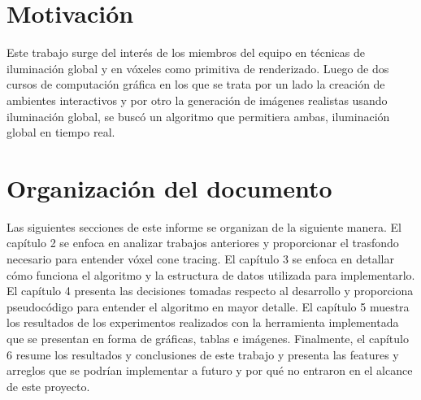 \section{Motivación}


Este trabajo surge del interés de los miembros del equipo en técnicas de iluminación global y en vóxeles como primitiva de renderizado.
Luego de dos cursos de computación gráfica en los que se trata por un lado la creación de ambientes interactivos y por otro la generación de imágenes realistas usando iluminación global, se buscó un algoritmo que permitiera ambas, iluminación global en tiempo real.

\section{Organización del documento}

Las siguientes secciones de este informe se organizan de la siguiente manera.
El capítulo 2 se enfoca en analizar trabajos anteriores y proporcionar el trasfondo necesario para entender vóxel cone tracing.
El capítulo 3 se enfoca en detallar cómo funciona el algoritmo y la estructura de datos utilizada para implementarlo.
El capítulo 4 presenta las decisiones tomadas respecto al desarrollo y proporciona pseudocódigo para entender el algoritmo en mayor detalle.
El capítulo 5 muestra los resultados de los experimentos realizados con la herramienta implementada que se presentan en forma de gráficas, tablas e imágenes.
Finalmente, el capítulo 6 resume los resultados y conclusiones de este trabajo y presenta las features y arreglos que se podrían implementar a futuro y por qué no entraron en el alcance de este proyecto.
